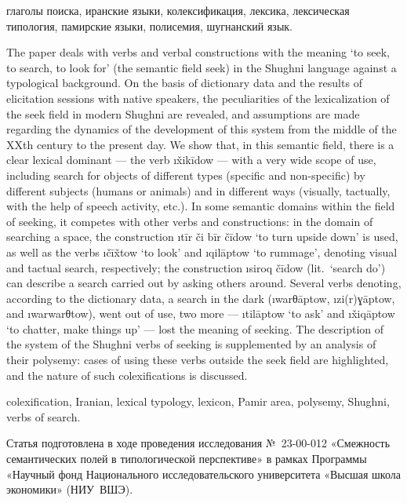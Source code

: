 \vfill

\begin{keywords}
глаголы поиска, иранские языки, колексификация, лексика, лексическая типология, памирские языки, полисемия, шугнанский язык.
\end{keywords}

\begin{eng-abstract}
The paper deals with verbs and verbal constructions with the meaning ‘to seek, to search, to look for’ (the semantic field {\sc seek}) in the Shughni language against a typological background. On the basis of dictionary data and the results of elicitation sessions with native speakers, the peculiarities of the lexicalization of the {\sc seek} field in modern Shughni are revealed, and assumptions are made regarding the dynamics of the development of this system from the middle of the XXth century to the present day. We show that, in this semantic field, there is a clear lexical dominant — the verb \i{x̌ikīdow} — with a very wide scope of use, including search for objects of different types (specific and non-specific) by different subjects (humans or animals) and in different ways (visually, tactually, with the help of speech activity, etc.). In some semantic domains within the field of seeking, it competes with other verbs and constructions: in the domain of searching a space, the construction \i{tīr či bīr čīdow} ‘to turn upside down’ is used, as well as the verbs \i{čīx̌tow} ‘to look’ and \i{qilāptow} ‘to rummage’, denoting visual and tactual search, respectively; the construction \i{siroq čīdow} (lit.~‘search do’) can describe a search carried out by asking others around. Several verbs denoting, according to the dictionary data, a search in the dark (\i{warθāptow}, \i{zi(r)ɣāptow}, and \i{warwarθtow}), went out of use, two more — \i{tilāptow} ‘to ask’ and \i{x̌iqāptow} ‘to chatter, make things up’ — lost the meaning of seeking. The description of the system of the Shughni verbs of seeking is supplemented by an analysis of their polysemy: cases of using these verbs outside the {\sc seek} field are highlighted, and the nature of such colexifications is discussed.
\end{eng-abstract}

\begin{eng-keywords}
colexification, Iranian, lexical typology, lexicon, Pamir area, polysemy, Shughni, verbs of search.
\end{eng-keywords}

\begin{acknowledgements}
Статья подготовлена в ходе проведения исследования №~23-00-012 «Смежность семантических полей в типологической перспективе» в рамках Программы «Научный фонд Национального исследовательского университета «Высшая школа экономики» (НИУ~ВШЭ).
\end{acknowledgements}

